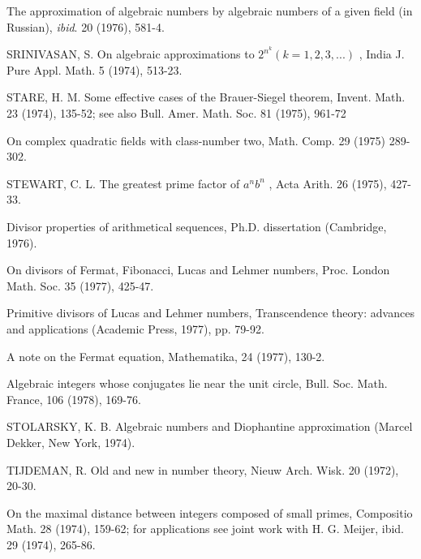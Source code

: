 \begin{hanglist}
    \item \hspace{1.5em} The approximation of algebraic numbers by algebraic numbers of a given field (in Russian), \textit{ibid}. 20 (1976), 581-4.
    \item SRINIVASAN, S. On algebraic approximations to  $2^{n^k}(k=1,2,3,...)$ , India J. Pure Appl. Math. 5 (1974), 513-23.
    \item STARE, H. M. Some effective cases of the Brauer-Siegel theorem, Invent. Math. 23 (1974), 135-52; see also Bull. Amer. Math. Soc. 81 (1975), 961-72
    \item \hspace{1.5em} On complex quadratic fields with class-number two, Math. Comp. 29 (1975) 289-302.
    \item STEWART, C. L. The greatest prime factor of  $a^n b^n$ , Acta Arith. 26 (1975), 427-33.
    \item \hspace{1.5em} Divisor properties of arithmetical sequences, Ph.D. dissertation (Cambridge, 1976).
    \item \hspace{1.5em} On divisors of Fermat, Fibonacci, Lucas and Lehmer numbers, Proc. London Math. Soc. 35 (1977), 425-47.
    \item \hspace{1.5em} Primitive divisors of Lucas and Lehmer numbers, Transcendence theory: advances and applications (Academic Press, 1977), pp. 79-92.
    \item \hspace{1.5em} A note on the Fermat equation, Mathematika, 24 (1977), 130-2.
    \item Algebraic integers whose conjugates lie near the unit circle, Bull. Soc. Math. France, 106 (1978), 169-76.
    \item STOLARSKY, K. B. Algebraic numbers and Diophantine approximation (Marcel Dekker, New York, 1974).
    \item TIJDEMAN, R. Old and new in number theory, Nieuw Arch. Wisk. 20 (1972), 20-30.
    \item \hspace{1.5em} On the maximal distance between integers composed of small primes, Compositio Math. 28 (1974), 159-62; for applications see joint work with H. G. Meijer, ibid. 29 (1974), 265-86.

\end{hanglist}
